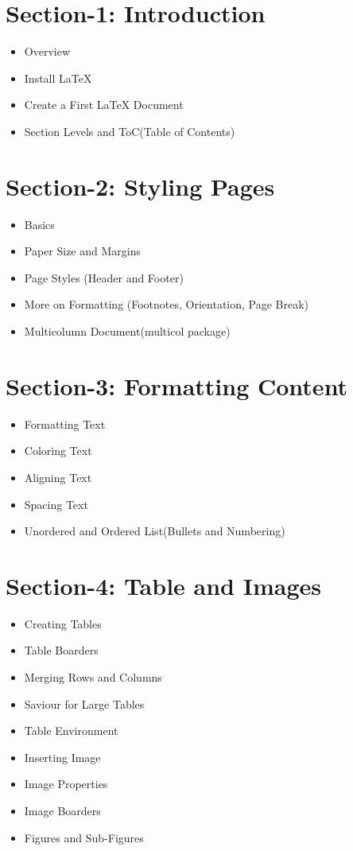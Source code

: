 \documentclass[a4paper, 12pt]{article}
\begin{document}
\section*{Section-1: Introduction} 
\begin{itemize}
	\item Overview 
	\item Install \LaTeX 
	\item Create a First {\LaTeX} Document 
	\item Section Levels and ToC(Table of Contents)
\end{itemize}
 
\section*{Section-2: Styling Pages} 
\begin{itemize}
	\item Basics  
	\item Paper Size and Margins  
	\item Page Styles (Header and Footer)
	\item More on Formatting (Footnotes, Orientation, Page Break) 
	\item Multicolumn Document(multicol package)
\end{itemize}


\section*{Section-3: Formatting Content} 
\begin{itemize}
	\item Formatting Text 
	\item Coloring Text   
	\item Aligning Text 
	\item Spacing Text 
	\item Unordered and Ordered List(Bullets and Numbering) 
\end{itemize}

\section*{Section-4: Table and Images} 
\begin{itemize}
	\item Creating Tables  
	\item Table Boarders
	\item Merging Rows and Columns 
	\item Saviour for Large Tables 
	\item Table Environment 
	\item Inserting Image 
	\item Image Properties 
	\item Image Boarders 
	\item Figures and Sub-Figures 
\end{itemize}
\end{document}
